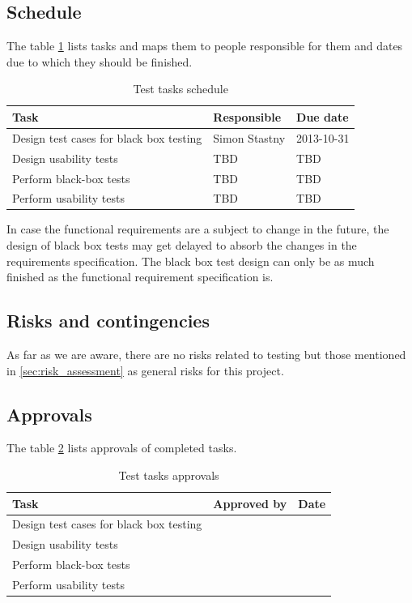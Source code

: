 \documentclass[11pt]{book}
\begin{document}
\subsection{Schedule}

The table \ref{tab:test_plan_schedule} lists tasks and maps them to people responsible for them and dates due to which they should be finished. 

\begin{table}[H]
	\centering
	\begin{tabular}{| l | l | l |}
		\hline
		Task & Responsible & Due date\\ \hline
		Design test cases for black box testing & Simon Stastny & 2013-10-31 \\ \hline
		Design usability tests & TBD & TBD \\ \hline
		Perform black-box tests & TBD & TBD \\ \hline
		Perform usability tests & TBD & TBD \\ \hline
	\end{tabular}
	\label{tab:test_plan_schedule}
	\caption{Test tasks schedule}
\end{table}

In case the functional requirements are a subject to change in the future, the design of black box tests may get delayed to absorb the changes in the requirements specification. The black box test design can only be as much finished as the functional requirement specification is.

\subsection{Risks and contingencies}

As far as we are aware, there are no risks related to testing but those mentioned in \ref{sec:risk_assessment} as general risks for this project.

\subsection{Approvals}

The table \ref{tab:test_plan_approvals} lists approvals of completed tasks.

\begin{table}[H]
	\centering
	\begin{tabular}{| l | l | l |}
		\hline
		Task & Approved by & Date\\ \hline
		Design test cases for black box testing & & \\ \hline
		Design usability tests & & \\ \hline
		Perform black-box tests & & \\ \hline
		Perform usability tests & & \\ \hline
	\end{tabular}
	\label{tab:test_plan_approvals}
	\caption{Test tasks approvals}
\end{table}
\end{document}
